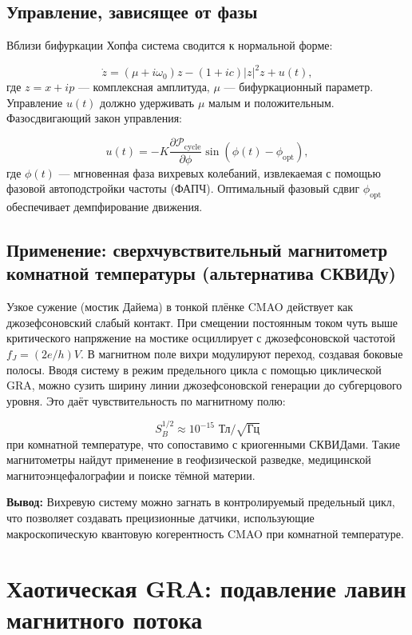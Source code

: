 \documentclass[12pt,a4paper]{article}
\numberwithin{equation}{section}
\begin{document}
\subsection{Управление, зависящее от фазы}

Вблизи бифуркации Хопфа система сводится к нормальной форме:

\begin{equation}
\dot{z} = (\mu + i\omega_0) z - (1 + i c) |z|^2 z + u(t),
\label{eq:hopf}
\end{equation}
где $z = x + i p$ — комплексная амплитуда, $\mu$ — бифуркационный параметр. Управление $u(t)$ должно удерживать $\mu$ малым и положительным. Фазосдвигающий закон управления:

\begin{equation}
u(t) = -K \frac{\partial \mathcal{P}_{\text{cycle}}}{\partial \phi} \sin(\phi(t) - \phi_{\text{opt}}),
\label{eq:phase_control}
\end{equation}
где $\phi(t)$ — мгновенная фаза вихревых колебаний, извлекаемая с помощью фазовой автоподстройки частоты (ФАПЧ). Оптимальный фазовый сдвиг $\phi_{\text{opt}}$ обеспечивает демпфирование движения.

\subsection{Применение: сверхчувствительный магнитометр комнатной температуры (альтернатива СКВИДу)}

Узкое сужение (мостик Дайема) в тонкой плёнке CMAO действует как джозефсоновский слабый контакт. При смещении постоянным током чуть выше критического напряжение на мостике осциллирует с джозефсоновской частотой $f_J = (2e/h) V$. В магнитном поле вихри модулируют переход, создавая боковые полосы. Вводя систему в режим предельного цикла с помощью циклической GRA, можно сузить ширину линии джозефсоновской генерации до субгерцового уровня. Это даёт чувствительность по магнитному полю:

\[
S_B^{1/2} \approx 10^{-15} \text{ Тл}/\sqrt{\text{Гц}}
\]
при комнатной температуре, что сопоставимо с криогенными СКВИДами. Такие магнитометры найдут применение в геофизической разведке, медицинской магнитоэнцефалографии и поиске тёмной материи.

\textbf{Вывод:} Вихревую систему можно загнать в контролируемый предельный цикл, что позволяет создавать прецизионные датчики, использующие макроскопическую квантовую когерентность CMAO при комнатной температуре.

\section{Хаотическая GRA: подавление лавин магнитного потока}
\label{sec:chaotic}
\end{document}
